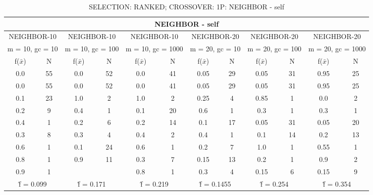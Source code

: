 \begin{table}[H]
	\centering
	\caption{SELECTION: RANKED; CROSSOVER: 1P: NEIGHBOR - self}
	\begin{adjustbox}{width=1\textwidth}
		\begin{tabular}{ |c|c||c|c||c|c||c|c||c|c||c|c| }
			\hline
			\multicolumn{12}{|c|}{NEIGHBOR - self} \\
			\hline
			\multicolumn{2}{|c||}{NEIGHBOR-10} & \multicolumn{2}{c||}{NEIGHBOR-10} & \multicolumn{2}{c||}{NEIGHBOR-10} & \multicolumn{2}{c||}{NEIGHBOR-20} & \multicolumn{2}{c||}{NEIGHBOR-20} & \multicolumn{2}{c|}{NEIGHBOR-20}\\
			\hline
			\multicolumn{2}{|c||}{m = 10, gc = 10} & \multicolumn{2}{c||}{m = 10, gc = 100} & \multicolumn{2}{c||}{m = 10, gc = 1000} & \multicolumn{2}{c||}{m = 20, gc = 10} & \multicolumn{2}{c||}{m = 20, gc = 100} & \multicolumn{2}{c|}{m = 20, gc = 1000}\\
			\hline
			f($\bar{x}$) & N & f($\bar{x}$) & N & f($\bar{x}$) & N & f($\bar{x}$) & N & f($\bar{x}$) & N & f($\bar{x}$) & N\\
			\hline
			\hline
			0.0 & 55 & 0.0 & 52 & 0.0 & 41 & 0.05 & 29 & 0.05 & 31 & 0.95 & 25\\
			\hline
			0.0 & 55 & 0.0 & 52 & 0.0 & 41 & 0.05 & 29 & 0.05 & 31 & 0.95 & 25\\
			0.1 & 23 & 1.0 & 2 & 1.0 & 2 & 0.25 & 4 & 0.85 & 1 & 0.0 & 2\\
			0.2 & 9 & 0.4 & 1 & 0.1 & 20 & 0.6 & 1 & 0.3 & 1 & 0.3 & 1\\
			0.4 & 1 & 0.2 & 6 & 0.2 & 14 & 0.1 & 17 & 0.05 & 31 & 0.05 & 20\\
			0.3 & 8 & 0.3 & 4 & 0.4 & 2 & 0.4 & 1 & 0.1 & 14 & 0.2 & 13\\
			0.6 & 1 & 0.1 & 24 & 0.6 & 1 & 0.2 & 7 & 1.0 & 1 & 0.55 & 1\\
			0.8 & 1 & 0.9 & 11 & 0.3 & 7 & 0.15 & 13 & 0.2 & 1 & 0.9 & 2\\
			0.9 & 1 &   &   & 0.8 & 1 & 0.3 & 4 & 0.15 & 6 & 0.15 & 9\\
			\hline
			\multicolumn{2}{|c||}{\^{f} = 0.099} & \multicolumn{2}{c||}{\^{f} = 0.171} & \multicolumn{2}{c||}{\^{f} = 0.219} & \multicolumn{2}{c||}{\^{f} = 0.1455} & \multicolumn{2}{c||}{\^{f} = 0.254} & \multicolumn{2}{c|}{\^{f} = 0.354}\\
			\hline
		\end{tabular}
	\end{adjustbox}
\end{table}
